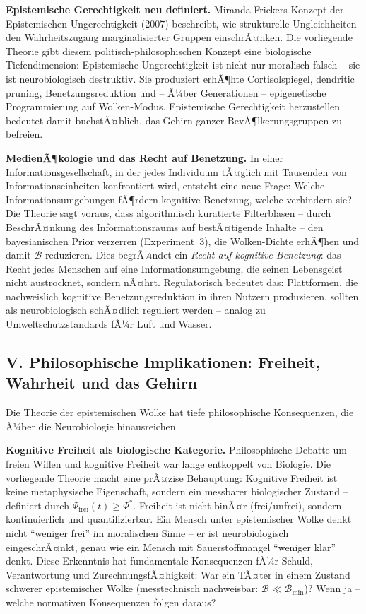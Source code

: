 ﻿\documentclass[12pt,a4paper]{report}
\theoremstyle{plain}
\theoremstyle{definition}
\theoremstyle{remark}
\begin{document}
	\textbf{Epistemische Gerechtigkeit neu definiert.}
	Miranda Frickers Konzept der Epistemischen Ungerechtigkeit
	(2007) beschreibt, wie strukturelle Ungleichheiten den
	Wahrheitszugang marginalisierter Gruppen einschrÃ¤nken.
	Die vorliegende Theorie gibt diesem politisch-philosophischen
	Konzept eine biologische Tiefendimension:
	Epistemische Ungerechtigkeit ist nicht nur moralisch falsch --
	sie ist neurobiologisch destruktiv.
	Sie produziert erhÃ¶hte Cortisolspiegel, dendritic pruning,
	Benetzungsreduktion und -- Ã¼ber Generationen -- epigenetische
	Programmierung auf Wolken-Modus.
	Epistemische Gerechtigkeit herzustellen bedeutet damit buchstÃ¤blich,
	das Gehirn ganzer BevÃ¶lkerungsgruppen zu befreien.

	\textbf{MedienÃ¶kologie und das Recht auf Benetzung.}
	In einer Informationsgesellschaft, in der jedes Individuum
	tÃ¤glich mit Tausenden von Informationseinheiten konfrontiert wird,
	entsteht eine neue Frage: Welche Informationsumgebungen fÃ¶rdern
	kognitive Benetzung, welche verhindern sie?
	Die Theorie sagt voraus, dass algorithmisch kuratierte Filterblasen
	-- durch BeschrÃ¤nkung des Informationsraums auf bestÃ¤tigende Inhalte --
	den bayesianischen Prior verzerren (Experiment~3),
	die Wolken-Dichte erhÃ¶hen und damit $\mathcal{B}$ reduzieren.
	Dies begrÃ¼ndet ein \emph{Recht auf kognitive Benetzung}:
	das Recht jedes Menschen auf eine Informationsumgebung,
	die seinen Lebensgeist nicht austrocknet, sondern nÃ¤hrt.
	Regulatorisch bedeutet das: Plattformen, die nachweislich
	kognitive Benetzungsreduktion in ihren Nutzern produzieren,
	sollten als neurobiologisch schÃ¤dlich reguliert werden --
	analog zu Umweltschutzstandards fÃ¼r Luft und Wasser.

	\subsection*{V. Philosophische Implikationen: Freiheit, Wahrheit
		und das Gehirn}

	Die Theorie der epistemischen Wolke hat tiefe philosophische
	Konsequenzen, die Ã¼ber die Neurobiologie hinausreichen.

	\textbf{Kognitive Freiheit als biologische Kategorie.}
	Philosophische Debatte um freien Willen und kognitive Freiheit
	war lange entkoppelt von Biologie.
	Die vorliegende Theorie macht eine prÃ¤zise Behauptung:
	Kognitive Freiheit ist keine metaphysische Eigenschaft,
	sondern ein messbarer biologischer Zustand -- definiert durch
	$\Psi_{\mathrm{frei}}(t) \geq \Psi^*$.
	Freiheit ist nicht binÃ¤r (frei/unfrei), sondern kontinuierlich
	und quantifizierbar. Ein Mensch unter epistemischer Wolke
	denkt nicht ``weniger frei'' im moralischen Sinne --
	er ist neurobiologisch eingeschrÃ¤nkt, genau wie ein Mensch
	mit Sauerstoffmangel ``weniger klar'' denkt.
	Diese Erkenntnis hat fundamentale Konsequenzen fÃ¼r Schuld,
	Verantwortung und ZurechnungsfÃ¤higkeit:
	War ein TÃ¤ter in einem Zustand schwerer epistemischer Wolke
	(messtechnisch nachweisbar: $\mathcal{B} \ll \mathcal{B}_{\min}$)?
	Wenn ja -- welche normativen Konsequenzen folgen daraus?
\end{document}
